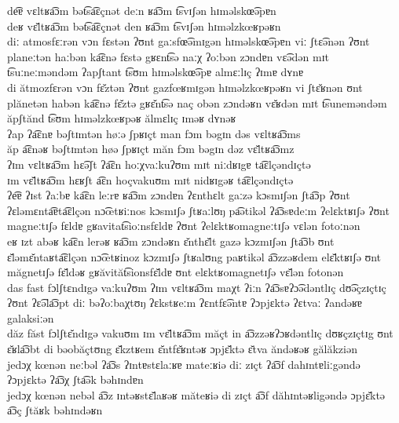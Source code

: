 \begin{exe}
  \ex \gll de͡ɐ vɛltʁa͡ɔm bət͡sa͡ɛçnət deːn ʁa͡ɔm t͡svɪʃən hɪməlskœ͡əpɐn\\
  deʁ vɛ̆ltʁa͡ɔm bət͡sa͡ɛçnət den ʁa͡ɔm t͡svɪʃən hɪməlzkœʁpəʁn\\
  \ex \gll diː atmosfɛːrən vɔn fɛstən ʔʊnt gaːsfœ͡əmɪgən hɪməlskœ͡əpɐn viː ʃtɛ͡ənən ʔʊnt planeːtən haːbən ka͡ɛnə fɛstə gʁɛnt͡sə naːχ ʔoːbən zɔndɐn vɛ͡ədən mɪt t͡suːneːməndəm ʔapʃtant t͡sʊm hɪməlskœ͡əpɐ almɛːlɪç ʔɪmɐ dʏnɐ\\
  di ătmozfɛrən vɔn fɛ̆ztən ʔʊnt gazfœʁmɪgən hɪməlzkœʁpəʁn vi ʃtɛ̆ʁnən ʊnt plănetən habən ka͡ɛnə fɛ̆ztə gʁɛ̆nt͡sə naç obən zɔndəʁn vɛ̆ʁdən mɪt t͡suneməndəm ăpʃtănd t͡sʊm hɪməlzkœʁpəʁ ălmɛlɪç ɪməʁ dʏnəʁ\\
  \ex \gll ʔap ʔa͡ɛnɐ bəʃtɪmtən høːə ʃpʁɪçt man fɔm bəgɪn dəs vɛltʁa͡ɔms\\
  ăp a͡ɛnəʁ bəʃtɪmtən høə ʃpʁɪçt măn fɔm bəgɪn dəz vɛ̆ltʁa͡ɔmz\\
  \ex \gll ʔɪm vɛltʁa͡ɔm hɛ͡əʃt ʔa͡ɛn hoːχvaːkuʔʊm mɪt niːdʁɪgɐ ta͡ɛlçəndɪçtə\\
  ɪm vɛ̆ltʁa͡ɔm hɛʁʃt a͡ɛn hoçvakuʊm mɪt nidʁɪgəʁ ta͡ɛlçəndɪçtə\\
  \ex \gll ʔe͡ɐ ʔɪst ʔaːbɐ ka͡ɛn leːrɐ ʁa͡ɔm zɔndɐn ʔɛnthɛlt gaːzə kɔsmɪʃən ʃta͡ɔp ʔʊnt ʔɛləmɛnta͡ɐta͡ɛlçən nɔ͡œtʁiːnos kɔsmɪʃə ʃtʁaːlʊŋ pa͡ətikəl ʔa͡ɔsɐdeːm ʔelɛktʁɪʃə ʔʊnt magneːtɪʃə fɛldɐ gʁavitat͡sioːnsfɛldɐ ʔʊnt ʔelɛktʁomagneːtɪʃə vɛlən fotoːnən\\
  eʁ ɪzt abəʁ ka͡ɛn lerəʁ ʁa͡ɔm zɔndəʁn ɛ̆nthɛ̆lt gazə kɔzmɪʃən ʃta͡ɔb ʊnt ɛ̆ləmɛ̆ntaʁta͡ɛlçən nɔ͡œtʁinoz kɔzmɪʃə ʃtʁalʊng paʁtikəl a͡ɔzzəʁdem elɛ̆ktʁɪʃə ʊnt măgnetɪʃə fɛ̆ldəʁ gʁăvităt͡sionsfɛ̆ldɐ ʊnt elɛktʁomagnetɪʃə vɛ̆lən fotonən\\
  \ex \gll das fast fɔlʃtɛndɪgə vaːkuʔʊm ʔɪm vɛltʁa͡ɔm maχt ʔiːn ʔa͡ɔsɐʔɔ͡ədəntlɪç dʊ͡əçzɪçtɪç ʔʊnt ʔɛ͡əla͡ɔpt diː bəʔoːbaχtʊŋ ʔɛkstʁeːm ʔɛntfɛ͡əntɐ ʔɔpjɛktə ʔɛtvaː ʔandəʁɐ galaksiːən\\
  dăz făst fɔlʃtɛ̆ndɪgə vakuʊm ɪm vɛ̆ltʁa͡ɔm măçt in a͡ɔzzəʁʔɔʁdəntlɪç dʊʁçzɪçtɪg ʊnt ɛ̆ʁla͡ɔbt di bəobăçtʊng ɛ̆kztʁem ɛ̆ntfɛ̆ʁntəʁ ɔpjɛ̆ktə ɛ̆tva ăndəʁəʁ gălăkziən\\
  \ex \gll jedɔχ kœnən neːbəl ʔa͡ɔs ʔɪntɐstɛlaːʁɐ mateːʁiə diː zɪçt ʔa͡ɔf dahɪntɐliːgəndə ʔɔpjɛktə ʔa͡ɔχ ʃta͡ək bəhɪndɐn\\
  jedɔχ kœnən nebəl a͡ɔz ɪntəʁstɛ̆laʁəʁ măteʁiə di zɪçt a͡ɔf dăhɪntəʁligəndə ɔpjɛ̆ktə a͡ɔç ʃtăʁk bəhɪndəʁn\\
\end{exe}

